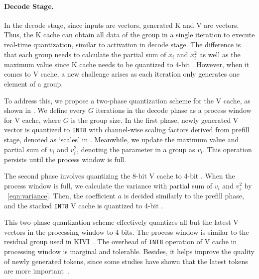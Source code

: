 \paragraph{Decode Stage.}
In the decode stage, since inputs are vectors, generated K and V are vectors.
Thus, the K cache can obtain all data of the group in a single iteration to execute real-time quantization, similar to activation in decode stage.
The difference is that each group needs to calculate the partial sum of $x_i$ and $x_i^2$ as well as the maximum value since K cache needs to be quantized to 4-bit \proj.
However, when it comes to V cache, a new challenge arises as each iteration only generates one element of a group.

To address this, we propose a two-phase quantization scheme for the V cache, as shown in .
We define every $G$ iterations in the decode phase as a process window for V cache, where $G$ is the group size. 
In the first phase, newly generated V vector is quantized to \texttt{INT8} with channel-wise scaling factors derived from prefill stage, denoted as `scales' in . 
Meanwhile, we update the maximum value and partial sum of $v_i$ and $v_i^2$, denoting the parameter in a group as $v_i$.
This operation persists until the process window is full. 


The second phase involves quantizing the 8-bit V cache to 4-bit \proj.
When the process window is full, we calculate the variance with partial sum of $v_i$ and $v_i^2$ by ~\eqref{eqn:variance}.
Then, the coefficient $a$ is decided similarly to the prefill phase, and the stacked \texttt{INT8} V cache is quantized to 4-bit \proj.

This two-phase quantization scheme effectively quantizes all but the latest V vectors in the processing window to 4 bits.
The process window is similar to the residual group used in KIVI~\cite{liu2024kivi}.
The overhead of \texttt{INT8} operation of V cache in processing window is marginal and tolerable.
Besides, it helps improve the quality of newly generated tokens, since some studies have shown that the latest tokens are more important~\cite{duanmu2024skvqslidingwindowkeyvalue}.


